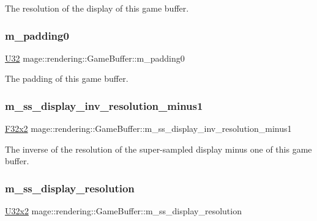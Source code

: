 The resolution of the display of this game buffer. \hypertarget{structmage_1_1rendering_1_1_game_buffer_ac0e92071c7409a5408047bd6116da200}{}\label{structmage_1_1rendering_1_1_game_buffer_ac0e92071c7409a5408047bd6116da200} 
\subsubsection{\texorpdfstring{m\+\_\+padding0}{m\_padding0}}
{\footnotesize\ttfamily \hyperlink{namespacemage_a41c104c036fba3756a74e19f793eeaa1}{U32} mage\+::rendering\+::\+Game\+Buffer\+::m\+\_\+padding0}

The padding of this game buffer. \hypertarget{structmage_1_1rendering_1_1_game_buffer_a471b606cff83755f74f855c780c3dc2a}{}\label{structmage_1_1rendering_1_1_game_buffer_a471b606cff83755f74f855c780c3dc2a} 
\subsubsection{\texorpdfstring{m\+\_\+ss\+\_\+display\+\_\+inv\+\_\+resolution\+\_\+minus1}{m\_ss\_display\_inv\_resolution\_minus1}}
{\footnotesize\ttfamily \hyperlink{namespacemage_aa87237ad091f5cd7da612b8523fc108f}{F32x2} mage\+::rendering\+::\+Game\+Buffer\+::m\+\_\+ss\+\_\+display\+\_\+inv\+\_\+resolution\+\_\+minus1}

The inverse of the resolution of the super-\/sampled display minus one of this game buffer. \hypertarget{structmage_1_1rendering_1_1_game_buffer_a76b01da64f8eb8f7ba431371a71d35a4}{}\label{structmage_1_1rendering_1_1_game_buffer_a76b01da64f8eb8f7ba431371a71d35a4} 
\subsubsection{\texorpdfstring{m\+\_\+ss\+\_\+display\+\_\+resolution}{m\_ss\_display\_resolution}}
{\footnotesize\ttfamily \hyperlink{namespacemage_a88e05bff0300120c013285d3dcad95c5}{U32x2} mage\+::rendering\+::\+Game\+Buffer\+::m\+\_\+ss\+\_\+display\+\_\+resolution}


